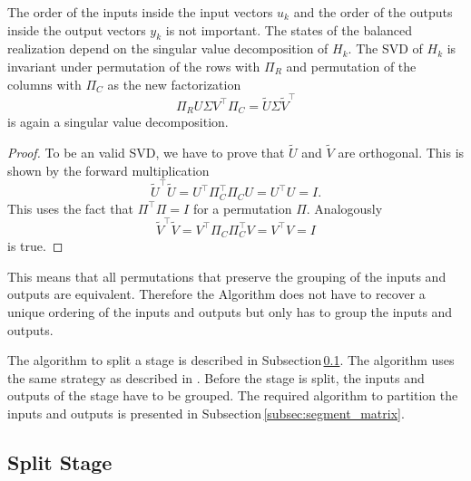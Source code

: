 \documentclass[doctype=mastersthesis,BCOR=15mm,biblatex]{ldvbook}%
\newcommand{\eye}{I} %
\begin{document}
The order of the inputs inside the input vectors $u_k$ and the order of the outputs inside the output vectors $y_k$ is not important.
The states of the balanced realization depend on the singular value decomposition of $H_k$.
The SVD of $H_k$ is invariant under permutation of the rows with $\Pi_R$ and permutation of the columns with $\Pi_C$ as the new factorization
\begin{equation}
	\Pi_R U \Sigma V^\top \Pi_C = \tilde{U} \Sigma \tilde{V}^\top 
\end{equation}
is again a singular value decomposition.
\begin{proof}
	To be an valid SVD, we have to prove that $\tilde{U}$ and $\tilde{V}$ are orthogonal.
	This is shown by the forward multiplication
	\begin{equation}
		\tilde{U}^\top \tilde{U} = U^\top \Pi_C^\top \Pi_C U = U^\top U = \eye 
		.
	\end{equation}
This uses the fact that $\Pi^\top \Pi = \eye$ for a permutation $\Pi$.
	Analogously 
	\begin{equation}
	\tilde{V}^\top \tilde{V} = V^\top \Pi_C \Pi_C^\top V = V^\top V = \eye
	\end{equation}
	is true.
\end{proof}
This means that all permutations that preserve the grouping of the inputs and outputs are equivalent.
Therefore the Algorithm does not have to recover a unique ordering of the inputs and outputs but only has to group the inputs and outputs.

The algorithm to split a stage is described in Subsection\,\ref{subsec:split_stage}.
The algorithm uses the same strategy as described in \cite{chandrasekaran_fast_2005}.
Before the stage is split, the inputs and outputs of the stage have to be grouped. 
The required algorithm to partition the inputs and outputs is presented in Subsection\,\ref{subsec:segment_matrix}.


\subsection{Split Stage}\label{subsec:split_stage}
\end{document}
